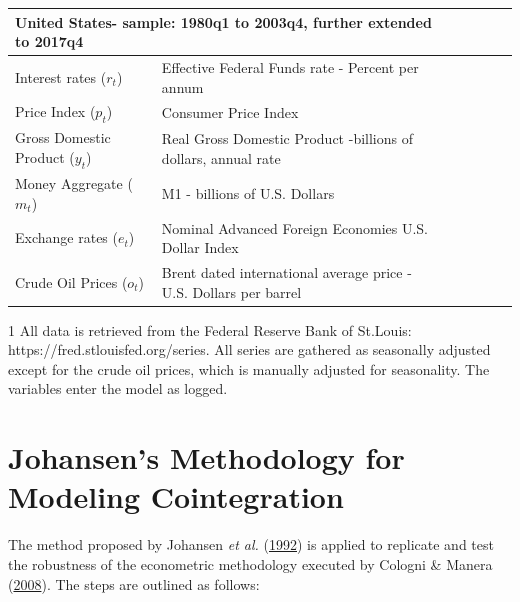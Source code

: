 \documentclass[11pt,preprint, authoryear]{elsarticle}
\let\origtable\table
\let\endorigtable\endtable
\renewenvironment{table}[1][2] {
    \expandafter\origtable\expandafter[H]
} {
    \endorigtable
}
\numberwithin{equation}{section}
\numberwithin{figure}{section}
\numberwithin{table}{section}
\begin{document}
\begin{table}
\caption{The Data.}
\begin{center}
\begin{threeparttable} [b]
\begin{tabular}{@{}lllllll@{}}
\toprule
\multicolumn{2}{l}{United States- sample: 1980q1 to 2003q4, further extended to 2017q4}&
\\
\midrule    
Interest rates ($r_t$) & Effective Federal Funds rate - Percent per annum\\ 
Price Index ($p_t$) & Consumer Price Index\\ 
Gross Domestic Product ($y_t$) & Real Gross Domestic Product -billions of dollars, annual rate\\ 
Money Aggregate ($m_t$) & M1 - billions of U.S. Dollars\\ 
Exchange rates ($e_t$) &  Nominal Advanced Foreign Economies U.S. Dollar Index\\  
Crude Oil Prices ($o_t$) & Brent dated international average price - U.S. Dollars per barrel\\  
\bottomrule
\end{tabular}
\begin{tablenotes}
    \item[1] All data is retrieved from the Federal Reserve Bank of St.Louis: https://fred.stlouisfed.org/series. All series are gathered as seasonally adjusted except for the crude oil prices, which is manually adjusted for seasonality. The variables enter the model as logged.
  \end{tablenotes}
\end{threeparttable}
\end{center}
\label{tab-1}
\end{table}

\hypertarget{johansens-methodology-for-modeling-cointegration}{%
\section{\texorpdfstring{Johansen's Methodology for Modeling
Cointegration
\label{j}}{Johansen's Methodology for Modeling Cointegration }}\label{johansens-methodology-for-modeling-cointegration}}

The method proposed by Johansen \emph{et al.}
(\protect\hyperlink{ref-johansen1992}{1992}) is applied to replicate and
test the robustness of the econometric methodology executed by Cologni
\& Manera (\protect\hyperlink{ref-cologni2008}{2008}). The steps are
outlined as follows:
\renewcommand{\labelenumii}{\arabic{enumi}.\arabic{enumii}}
\renewcommand{\labelenumiii}{\arabic{enumi}.\arabic{enumii}.\arabic{enumiii}}
\renewcommand{\labelenumiv}{\arabic{enumi}.\arabic{enumii}.\arabic{enumiii}.\arabic{enumiv}}
\end{document}
